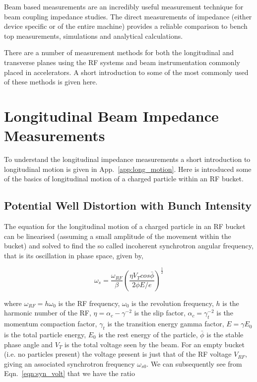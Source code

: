 \label{chap:BBmeas}

Beam based measurements are an incredibly useful measurement technique for beam coupling impedance studies. The direct measurements of impedance (either device specific or of the entire machine) provides a reliable comparison to bench top measurements, simulations and analytical calculations. 

There are a number of measurement methods for both the longitudinal and transverse planes using the RF systems and beam instrumentation commonly placed in accelerators. A short introduction to some of the most commonly used of these methods is given here.

\section{Longitudinal Beam Impedance Measurements}

To understand the longitudinal impedance measurements a short introduction to longitudinal motion is given in App.~\ref{app:long_motion}. Here is introduced some of the basics of longitudinal motion of a charged particle within an RF bucket.

\subsection{Potential Well Distortion with Bunch Intensity}
\label{sec:pot-well-dist}

The equation for the longitudinal motion of a charged particle in an RF bucket can be linearised (assuming a small amplitude of the movement within the bucket) and solved to find the so called incoherent synchrotron angular frequency, that is its oscillation in phase space, given by,

\begin{equation}
\omega_{s} = \frac{\omega_{RF}}{\beta} \left( \frac{\eta V_{T}cos\bar{\phi}}{2\phi E/e}  \right)^{\frac{1}{2}}
\label{eqn:syn_volt}
\end{equation}

where $\omega_{RF} = h\omega_{0}$ is the RF frequency, $\omega_{0}$ is the revolution frequency, $h$ is the harmonic
number of the RF, $\eta = \alpha_{c} - \gamma^{-2}$ is the slip factor, $\alpha_{c} = \gamma_{t}^{-2}$ is the momentum compaction factor, $\gamma_{t}$ is the transition energy gamma factor, $E=\gamma E_{0}$ is the total particle energy, $E_{0}$ is the rest energy of the particle, $\bar{\phi}$ is the stable phase angle and $V_{T}$ is the total voltage seen by the beam. For an empty bucket (i.e. no particles present) the voltage present is just that of the RF voltage $V_{RF}$, giving an associated synchrotron frequency $\omega_{s0}$. We can subsequently see from Eqn.~\ref{eqn:syn_volt} that we have the ratio

